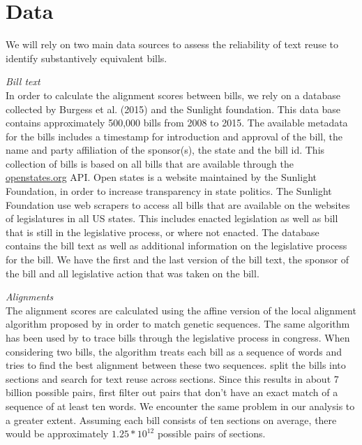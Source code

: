 \documentclass[12pt]{article} %
\begin{document}
\section{Data}

We will rely on two main data sources to assess the reliability of text reuse to
identify substantively equivalent bills. 

\textit{Bill text}\\
In order to calculate the alignment scores between bills, we rely on a database collected by Burgess et al. (2015) and the Sunlight foundation. This data base contains approximately 500,000 bills from 2008 to 2015. The available metadata for the bills includes a timestamp for introduction and approval of the bill, the name and party affiliation of the sponsor(s), the state and the bill id.  This collection of bills is based on all bills that are available through the \url{openstates.org} API. Open states is a website maintained by the Sunlight Foundation, in order to increase transparency in state politics. The Sunlight Foundation use web scrapers to access all bills that are available on the websites of legislatures in all US states. This includes enacted legislation as well as bill that is still in the legislative process, or where not enacted. The database contains the bill text as well as additional information on the legislative process for the bill. We have the first and the last version of the bill text, the sponsor of the bill and all legislative action that was taken on the bill. 

\textit{Alignments}\\
The alignment scores are calculated using the affine version of the local alignment algorithm proposed by \citet{smith1981identification} in order to match genetic sequences. The same algorithm has been used by \citet{wilkerson2015tracing} to trace bills through the legislative process in congress. When considering two bills, the algorithm treats each bill as a sequence of words and tries to find the best alignment between these two sequences. \citet{wilkerson2015tracing} split the bills into sections and search for text reuse across sections. Since this results in about 7 billion possible pairs, first filter out pairs that don't have an exact match of a sequence of at least ten words. We encounter the same problem in our analysis to a greater extent. Assuming each bill consists of ten sections on average, there would be approximately $1.25 * 10^{12}$ possible pairs of sections. 
\end{document}
